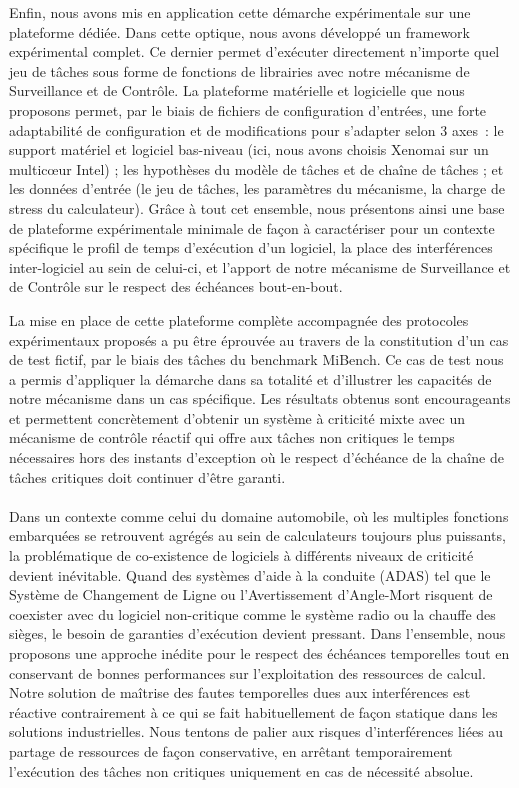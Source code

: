 \documentclass[a4paper,11pt,twoside]{StyleThese}
\begin{document}
Enfin, nous avons mis en application cette démarche expérimentale sur une plateforme dédiée. Dans cette optique, nous avons développé un framework expérimental complet. Ce dernier permet d'exécuter directement n'importe quel jeu de tâches sous forme de fonctions de librairies avec notre mécanisme de Surveillance et de Contrôle. La plateforme matérielle et logicielle que nous proposons permet, par le biais de fichiers de configuration d'entrées, une forte adaptabilité de configuration et de modifications pour s'adapter selon 3 axes~: le support matériel et logiciel bas-niveau (ici, nous avons choisis Xenomai sur un multicœur Intel) ; les hypothèses du modèle de tâches et de chaîne de tâches ; et les données d'entrée (le jeu de tâches, les paramètres du mécanisme, la charge de stress du calculateur). Grâce à tout cet ensemble, nous présentons ainsi une base de plateforme expérimentale minimale de façon à caractériser pour un contexte spécifique le profil de temps d'exécution d'un logiciel, la place des interférences inter-logiciel au sein de celui-ci, et l'apport de notre mécanisme de Surveillance et de Contrôle sur le respect des échéances bout-en-bout. 

La mise en place de cette plateforme complète accompagnée des protocoles expérimentaux proposés a pu être éprouvée au travers de la constitution d'un cas de test fictif, par le biais des tâches du benchmark MiBench. Ce cas de test nous a permis d'appliquer la démarche dans sa totalité et d'illustrer les capacités de notre mécanisme dans un cas spécifique. Les résultats obtenus sont encourageants et permettent concrètement d'obtenir un système à criticité mixte avec un mécanisme de contrôle réactif qui offre aux tâches non critiques le temps nécessaires hors des instants d'exception où le respect d'échéance de la chaîne de tâches critiques doit continuer d'être garanti. 

\paragraph*{} Dans un contexte comme celui du domaine automobile, où les multiples fonctions embarquées se retrouvent agrégés au sein de calculateurs toujours plus puissants, la problématique de co-existence de logiciels à différents niveaux de criticité devient inévitable. Quand des systèmes d'aide à la conduite (ADAS) tel que le Système de Changement de Ligne ou l'Avertissement d'Angle-Mort risquent de coexister avec du logiciel non-critique comme le système radio ou la chauffe des sièges, le besoin de garanties d'exécution devient pressant. Dans l'ensemble, nous proposons une approche inédite pour le respect des échéances temporelles tout en conservant de bonnes performances sur l'exploitation des ressources de calcul. Notre solution de maîtrise des fautes temporelles dues aux interférences est réactive contrairement à ce qui se fait habituellement de façon statique dans les solutions industrielles. Nous tentons de palier aux risques d'interférences liées au partage de ressources de façon conservative, en arrêtant temporairement l'exécution des tâches non critiques uniquement en cas de nécessité absolue. 
\end{document}
